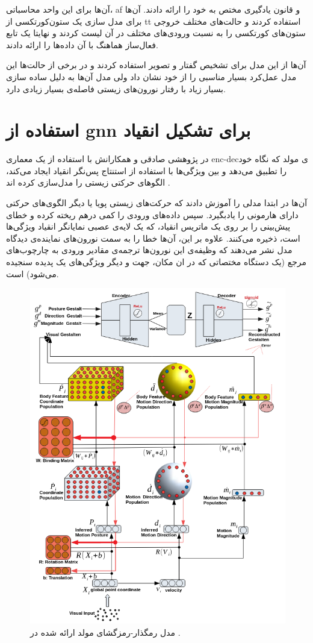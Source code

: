 \documentclass[12pt]{report}
\begin{document}
آن‌ها برای این واحد محاسباتی، \gls{af} و قانون یادگیری مختص به خود را ارائه دادند. آن‌ها برای مدل سازی یک ستون‌کورتکسی از \gls{tt}  استفاده کردند و حالت‌های مختلف خروجی ستون‌های کورتکسی را به نسبت ورودی‌های مختلف در آن لیست کردند و نهایتا یک تابع فعال‌ساز هماهنگ با آن داده‌ها را ارائه دادند. 

آن‌ها از این مدل برای تشخیص گفتار و تصویر استفاده کردند و در برخی از حالت‌ها این مدل عمل‌کرد بسیار مناسبی را از خود نشان داد ولی مدل آن‌ها به دلیل ساده سازی بسیار زیاد با رفتار نورون‌های زیستی فاصله‌ی بسیار زیادی دارد.


\section{استفاده از \gls{gnn} برای تشکیل انقیاد}
در پژوهشی صادقی و همکارانش با استفاده از یک معماری \gls{enc-dec}ی مولد که نگاه خود را تطبیق می‌دهد و بین ویژگی‌ها با استفاده از استنتاج پس‌نگر انقیاد ایجاد می‌کند، الگو‌های حرکتی زیستی را مدل‌سازی کرده اند \cite{Sadeghi2021}.

آن‌ها در ابتدا مدلی را آموزش دادند که حرکت‌های زیستی پویا یا دیگر الگوی‌های حرکتی دارای هارمونی را یادبگیرد. سپس داده‌های ورودی را کمی درهم ریخته‌ کرده و خطای پیش‌بینی را بر روی یک ماتریس انقیاد، که یک لایه‌ی عصبی نمایانگر انقیاد ویژگی‌ها است، ذخیره می‌کنند. علاوه‌ بر این، آن‌ها خطا را به سمت نورون‌های نماینده‌ی دیدگاه مدل نشر می‌دهند که وظیفه‌ی این نورون‌ها ترجمه‌ی مقادیر ورودی به چارچوب‌های مرجع (یک دستگاه مختصاتی که در ان مکان، جهت و دیگر ویژگی‌های یک پدیده سنجیده می‌شود) است.

\begin{figure}[]
	\centering
	\includegraphics[width=0.8\linewidth]{gnn.png}
	\caption[NS]{
		مدل رمگذار-رمزگشای مولد ارائه شده در  \cite{Sadeghi2021}.
	}
	\label{fig:gnn}
\end{figure}
\end{document}
